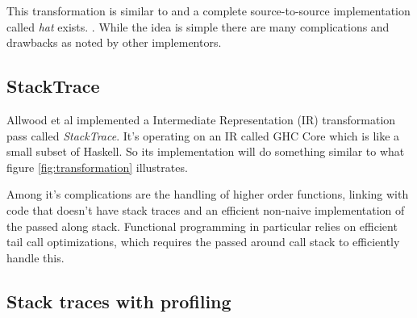 This transformation is similar to
\cite{ghc_wiki_explicitcs_transformation}  and a complete
source-to-source implementation called \emph{hat} exists.
\cite{hat_website}.  While the idea is simple there are many
complications and drawbacks as noted by other implementors.

\subsection{StackTrace}

Allwood et al implemented a Intermediate Representation (IR) transformation
pass called \emph{StackTrace}. It's operating on an IR called GHC Core which
is like a small subset of Haskell. So its implementation will do something
similar to what figure \ref{fig:transformation} illustrates.

Among it's complications are the
handling of higher order functions, linking with code that doesn't have stack
traces and an efficient non-naive implementation of the
passed along stack. \cite{FindingTheNeedle2009}
Functional programming in particular relies on efficient tail call
optimizations, which
requires the passed around call stack to efficiently handle this.



\subsection{Stack traces with profiling}

